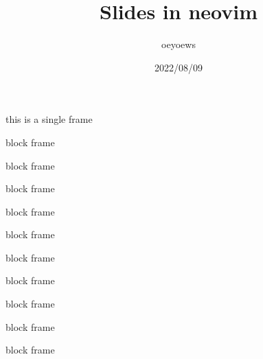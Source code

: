 \documentclass{beamer}
\title{Slides in neovim}
\author{oeyoews}
\date{2022/08/09}
\begin{document}
\maketitle

\frame

this is a single frame

\begin{frame}
  block frame
\end{frame}

\begin{frame}
  block frame
\end{frame}

\begin{frame}
  block frame
\end{frame}

\begin{frame}
  block frame
\end{frame}

\begin{frame}
  block frame
\end{frame}

\begin{frame}
  block frame
\end{frame}

\begin{frame}
  block frame
\end{frame}

\begin{frame}
  block frame
\end{frame}

\begin{frame}
  block frame
\end{frame}

\begin{frame}
  block frame
\end{frame}
\end{document}
